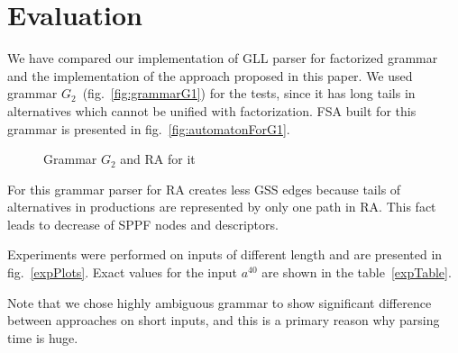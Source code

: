 \documentclass[runningheads,a4paper]{llncs}
\begin{document}





\section{Evaluation}

We have compared our implementation of GLL parser for factorized grammar and the implementation of the approach proposed in this paper.
We used grammar $G_2$~(fig.~\ref{fig:grammarG1}) for the tests, since it has long tails in alternatives which cannot be unified with factorization.
FSA built for this grammar is presented in fig.~\ref{fig:automatonForG1}.

\begin{figure}[ht]   
    \centering

    \caption{Grammar $G_2$ and RA for it}
\end{figure}

For this grammar parser for RA creates less GSS edges because tails of alternatives in productions
are represented by only one path in RA. This fact leads to decrease of SPPF nodes and descriptors.

Experiments were performed on inputs of different length and are presented in fig.~\ref{expPlots}.
Exact values for the input $a^{40}$ are shown in the table~\ref{expTable}.

Note that we chose highly ambiguous grammar to show significant difference between approaches on short inputs, and this is a primary reason why parsing time is huge. 
\end{document}
